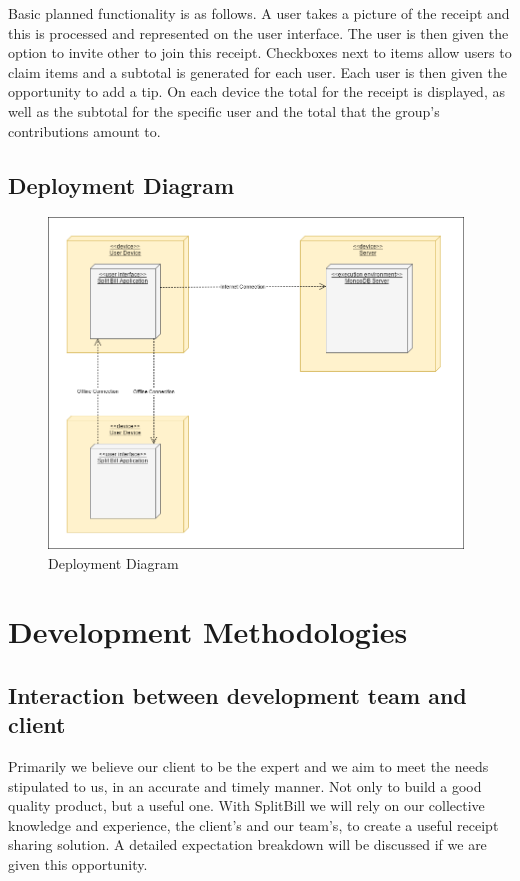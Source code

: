 \documentclass[12pt,a4paper]{article}
\begin{document}
   Basic planned functionality is as follows. A user takes a picture of the receipt and this is processed and represented on the user interface. The user is then given the option to invite other to join this receipt. Checkboxes
   next to items allow users to claim items and a subtotal is generated for each user. Each user is then given the opportunity to add a tip. On each device the total for the receipt is displayed, as well as the subtotal for the
   specific user and the total that the group's contributions amount to.

   \clearpage
   \subsection{Deployment Diagram}
   \begin{figure}[h]
   \center
   \includegraphics[width=0.98\textwidth]{SplitBill_deployment.png}
   \caption{Deployment Diagram}
   \end{figure}
   \newpage
   \section{Development Methodologies}
   \subsection{Interaction between development team and client}
   Primarily we believe our client to be the expert and we aim to meet the needs stipulated to us, in an accurate and timely manner. Not only to build a good quality product, but a useful one. With SplitBill we will rely on our
   collective knowledge and experience, the client's and our team's, to create a useful receipt sharing solution. A detailed expectation breakdown will be discussed if we are given this opportunity.
\end{document}
